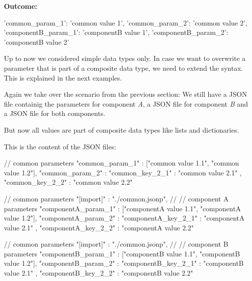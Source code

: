 \textbf{Outcome:}

\vspace{2ex}

\begin{pythonlog}
{'common_param_1': 'common value 1',
 'common_param_2': 'common value 2',
 'componentB_param_1': 'componentB value 1',
 'componentB_param_2': 'componentB value 2'}
\end{pythonlog}

\vspace{2ex}

Up to now we considered simple data types only. In case we want to overwrite a parameter that is part of a composite data type, we need to extend the syntax.
This is explained in the next examples.

\vspace{2ex}

Again we take over the scenario from the previous section: We still have a JSON file  containig the parameters for
component \textit{A}, a JSON file  for component \textit{B} and a JSON file  for both components.

But now all values are part of composite data types like lists and dictionaries.

This is the content of the JSON files:

\vspace{2ex}

\textbullet {}

\begin{pythoncode}
{
   // common parameters
   "common_param_1" : ["common value 1.1", "common value 1.2"],
   "common_param_2" : {"common_key_2_1" : "common value 2.1" ,
                       "common_key_2_2" : "common value 2.2"}
}
\end{pythoncode}

\textbullet {}

\begin{pythoncode}
{
   // common parameters
   "[import]" : "./common.jsonp",
   //
   // component A parameters
   "componentA_param_1" : ["componentA value 1.1", "componentA value 1.2"],
   "componentA_param_2" : {"componentA_key_2_1" : "componentA value 2.1" ,
                           "componentA_key_2_2" : "componentA value 2.2"}
}
\end{pythoncode}

\textbullet {}

\begin{pythoncode}
{
   // common parameters
   "[import]" : "./common.jsonp",
   //
   // component B parameters
   "componentB_param_1" : ["componentB value 1.1", "componentB value 1.2"],
   "componentB_param_2" : {"componentB_key_2_1" : "componentB value 2.1" ,
                           "componentB_key_2_2" : "componentB value 2.2"}
}
\end{pythoncode}

